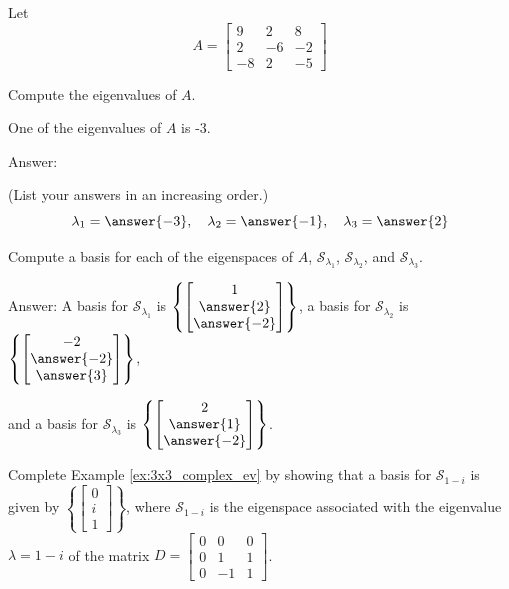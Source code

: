\documentclass{ximera}
\begin{document}
\begin{problem}\label{prob:3x3fromKuttler1} Let $$A=\begin{bmatrix} 9 & 2 & 8\\ 2 & -6 & -2\\ -8 & 2 & -5\end{bmatrix}$$

\begin{question}
Compute the eigenvalues of $A$. 
\begin{hint}
One of the eigenvalues of $A$ is -3.
\end{hint}

Answer:

(List your answers in an increasing order.)
$$\lambda_1 = \answer{-3},\quad \lambda_2 = \answer{-1},\quad \lambda_3 = \answer{2}$$
\end{question}

\begin{question}
    
Compute a basis for each of the eigenspaces of $A$,  $\mathcal{S}_{\lambda_1}$, $\mathcal{S}_{\lambda_2}$, and $\mathcal{S}_{\lambda_3}$.

Answer:
A basis for $\mathcal{S}_{\lambda_1}$ is $\left\{\begin{bmatrix}1\\\answer{2}\\\answer{-2}\end{bmatrix}\right\}$, 
a basis for $\mathcal{S}_{\lambda_2}$ is $\left\{\begin{bmatrix}-2\\\answer{-2}\\\answer{3}\end{bmatrix}\right\}$,

and a basis for $\mathcal{S}_{\lambda_3}$ is $\left\{\begin{bmatrix}2\\\answer{1}\\\answer{-2}\end{bmatrix}\right\}$.
\end{question}
\end{problem}


\begin{problem}\label{prob:3x3_complex_ev}
Complete Example \ref{ex:3x3_complex_ev} by showing that a basis for $\mathcal{S}_{1-i}$ is given by $\left\{\begin{bmatrix}0\\i\\1\end{bmatrix}\right\}$, where  $\mathcal{S}_{1-i}$ is the eigenspace associated with the eigenvalue $\lambda=1-i$ of the matrix $D=\begin{bmatrix} 0&0&0\\ 0 &1&1\\ 0 & -1&1\end{bmatrix}$.
\end{problem}
\end{document}
